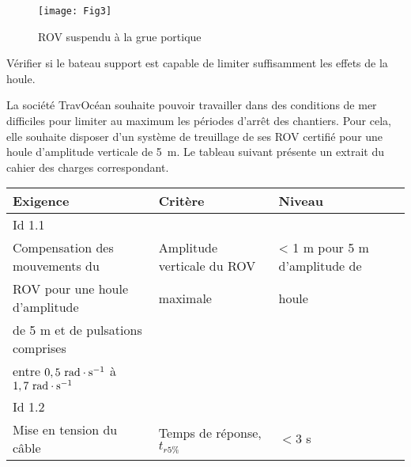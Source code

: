 \begin{multicols}{2}
%
\begin{figure}[H]
\centering
\texttt{[image: Fig3]}
\caption{ROV suspendu à la grue portique}
\label{Fig3}
\end{figure}
%



\begin{obj}
Vérifier si le bateau support est capable de limiter suffisamment les effets de la houle.
\end{obj}


\ifprof
\else
La société TravOcéan souhaite pouvoir travailler dans des conditions de mer difficiles pour limiter au maximum
les périodes d’arrêt des chantiers. Pour cela, elle souhaite disposer d’un système de treuillage de ses ROV
certifié pour une houle d’amplitude verticale de \SI{5}{m}. Le tableau suivant 
présente un extrait du cahier des charges correspondant.

\footnotesize
\begin{center}
\begin{tabular}{|p{3cm}|p{2cm}|p{2cm}|}
\hline
\textbf{Exigence} &\textbf{Critère}& \textbf{Niveau}\\
\hline
\hline
Id 1.1&&\\
Compensation des mouvements du&Amplitude verticale du ROV&< 1 m pour 5 m d’amplitude de\\
ROV pour une houle d’amplitude&maximale&houle\\
de 5 m et de pulsations comprises&&\\
entre $0,5 \ \text{rad}\cdot \text s^{-1}$ à $1,7 \ \text{rad}\cdot \text s^{-1}$&&\\
\hline
Id 1.2&&\\
Mise en tension du câble &Temps de réponse, $t_{r5\%}$ & $< 3$ s \\
\hline
\end{tabular}


\end{center}
\end{multicols}

